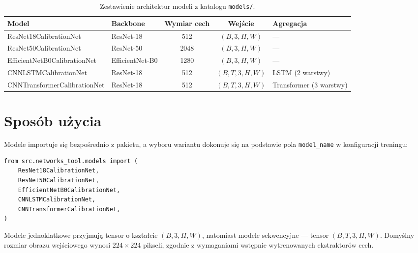 \documentclass[12pt,a4paper]{report}
\begin{document}
\begin{table}[htbp]
  \centering
  \caption{Zestawienie architektur modeli z katalogu \texttt{models/}.}
  \label{tab:modele}
  \small
  \begin{tabular}{@{}llccl@{}}
    \toprule
    \textbf{Model} & \textbf{Backbone} & \textbf{Wymiar cech} & \textbf{Wejście} & \textbf{Agregacja} \\
    \midrule
    ResNet18CalibrationNet      & ResNet-18       & 512  & $(B,3,H,W)$   & --- \\
    ResNet50CalibrationNet      & ResNet-50       & 2048 & $(B,3,H,W)$   & --- \\
    EfficientNetB0CalibrationNet& EfficientNet-B0 & 1280 & $(B,3,H,W)$   & --- \\
    CNNLSTMCalibrationNet       & ResNet-18       & 512  & $(B,T,3,H,W)$ & LSTM (2 warstwy) \\
    CNNTransformerCalibrationNet& ResNet-18       & 512  & $(B,T,3,H,W)$ & Transformer (3 warstwy) \\
    \bottomrule
  \end{tabular}
\end{table}

\section{Sposób użycia}
Modele importuje się bezpośrednio z pakietu, a wyboru wariantu dokonuje się na podstawie
pola \texttt{model\_name} w konfiguracji treningu:

\begin{lstlisting}
from src.networks_tool.models import (
    ResNet18CalibrationNet,
    ResNet50CalibrationNet,
    EfficientNetB0CalibrationNet,
    CNNLSTMCalibrationNet,
    CNNTransformerCalibrationNet,
)
\end{lstlisting}

Modele jednoklatkowe przyjmują tensor o kształcie $(B, 3, H, W)$, natomiast modele
sekwencyjne --- tensor $(B, T, 3, H, W)$. Domyślny rozmiar obrazu wejściowego wynosi
$224 \times 224$ pikseli, zgodnie z wymaganiami wstępnie wytrenowanych ekstraktorów cech.
\end{document}
